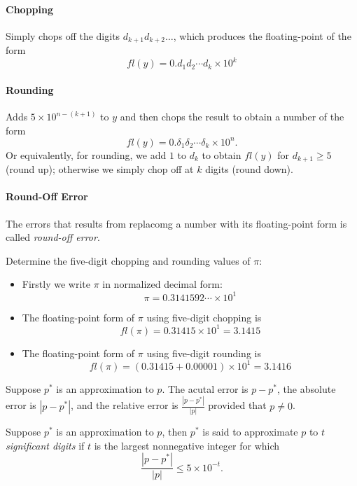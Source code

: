 \paragraph{Chopping} Simply chops off the digits $d_{k+1}d_{k+2}\dots$, which produces the floating-point of the form
\[
fl(y) = 0.d_1d_2\cdots d_k\times 10^k
\]
\paragraph{Rounding} Adds $5\times 10^{n-(k+1)}$ to $y$ and then chops the result to obtain a number of the form
\[
fl(y) = 0.\delta_1\delta_2\cdots\delta_k\times 10^n.
\]
Or equivalently, for rounding, we add $1$ to $d_k$ to obtain $fl(y)$ for $d_{k+1}\ge5$ (round up); otherwise we simply chop off at $k$ digits (round down).

\paragraph{Round-Off Error} The errors that results from replacomg a number with its floating-point form is called \emph{round-off error}.

\begin{example}
Determine the five-digit chopping and rounding values of $\pi$:
\begin{itemize}
\item
Firstly we write $\pi$ in normalized decimal form:
\[
\pi=0.3141592\cdots\times 10^1
\]
\item
The floating-point form of $\pi$ using five-digit chopping is
\[
fl(\pi)=0.31415\times10^1=3.1415
\]
\item
The floating-point form of $\pi$ using five-digit rounding is
\[
fl(\pi)=(0.31415+0.00001)\times10^1=3.1416
\]
\end{itemize}
\end{example}



\begin{definition}
Suppose $p^*$ is an approximation to $p$. The acutal error is $p-p^*$, the absolute error is $|p-p^*|$, and the relative error is $\frac{|p-p^*|}{|p|}$ provided that $p\ne0$.
\end{definition}
\begin{definition}
Suppose $p^*$ is an approximation to $p$, then $p^*$ is said to approximate $p$ to $t$ \emph{significant digits} if $t$ is the largest nonnegative integer for which
\[
\frac{|p-p^*|}{|p|}\le5\times 10^{-t}.
\]
\end{definition}
